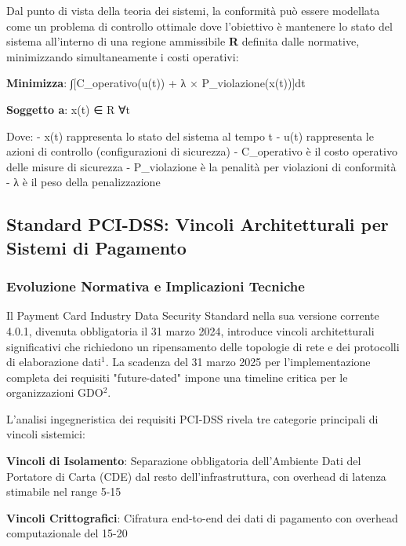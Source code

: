 {Dal punto di vista della teoria dei sistemi, la conformità può essere modellata come un problema di controllo ottimale dove l'obiettivo è mantenere lo stato del sistema all'interno di una regione ammissibile \textbf{R} definita dalle normative, minimizzando simultaneamente i costi operativi:

\textbf{Minimizza}: ∫[C_operativo(u(t)) + λ × P_violazione(x(t))]dt

\textbf{Soggetto a}: x(t) ∈ R ∀t

Dove:
- x(t) rappresenta lo stato del sistema al tempo t
- u(t) rappresenta le azioni di controllo (configurazioni di sicurezza)
- C_operativo è il costo operativo delle misure di sicurezza
- P_violazione è la penalità per violazioni di conformità
- λ è il peso della penalizzazione

\subsection{Standard PCI-DSS: Vincoli Architetturali per Sistemi di Pagamento}

\subsubsection{Evoluzione Normativa e Implicazioni Tecniche}

Il Payment Card Industry Data Security Standard nella sua versione corrente 4.0.1, divenuta obbligatoria il 31 marzo 2024, introduce vincoli architetturali significativi che richiedono un ripensamento delle topologie di rete e dei protocolli di elaborazione dati$^{1}$. La scadenza del 31 marzo 2025 per l'implementazione completa dei requisiti "future-dated" impone una timeline critica per le organizzazioni GDO$^{2}$.

L'analisi ingegneristica dei requisiti PCI-DSS rivela tre categorie principali di vincoli sistemici:

\textbf{Vincoli di Isolamento}: Separazione obbligatoria dell'Ambiente Dati del Portatore di Carta (CDE) dal resto dell'infrastruttura, con overhead di latenza stimabile nel range 5-15%

\textbf{Vincoli Crittografici}: Cifratura end-to-end dei dati di pagamento con overhead computazionale del 15-20%

}
